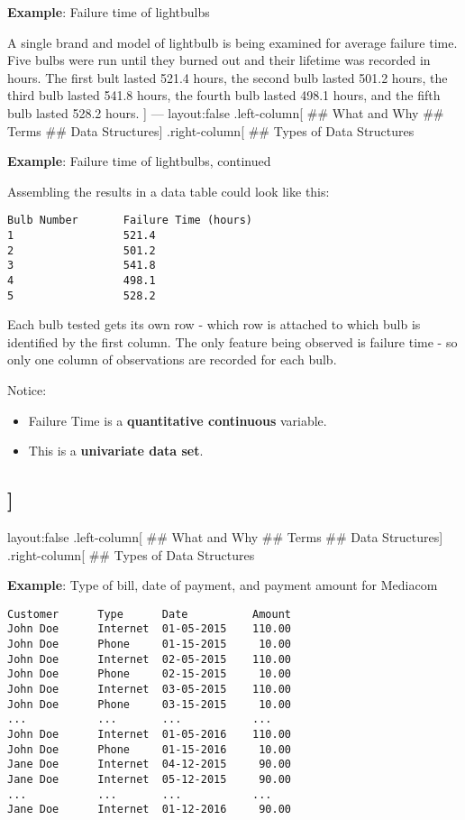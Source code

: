 \documentclass[]{article}
\providecommand{\tightlist}{%
  \setlength{\itemsep}{0pt}\setlength{\parskip}{0pt}}
\begin{document}
\textbf{Example}: Failure time of lightbulbs

A single brand and model of lightbulb is being examined for average
failure time. Five bulbs were run until they burned out and their
lifetime was recorded in hours. The first bult lasted 521.4 hours, the
second bulb lasted 501.2 hours, the third bulb lasted 541.8 hours, the
fourth bulb lasted 498.1 hours, and the fifth bulb lasted 528.2 hours.
{]} --- layout:false .left-column{[} \#\# What and Why \#\# Terms \#\#
Data Structures{]} .right-column{[} \#\# Types of Data Structures

\textbf{Example}: Failure time of lightbulbs, continued

Assembling the results in a data table could look like this:

\begin{verbatim}
Bulb Number       Failure Time (hours)
1                 521.4
2                 501.2
3                 541.8
4                 498.1
5                 528.2
\end{verbatim}

Each bulb tested gets its own row - which row is attached to which bulb
is identified by the first column. The only feature being observed is
failure time - so only one column of observations are recorded for each
bulb.

Notice:

\begin{itemize}
\tightlist
\item
  Failure Time is a \textbf{quantitative continuous} variable.
\item
  This is a \textbf{univariate data set}.
\end{itemize}

\subsection{{]}}\label{section}

layout:false .left-column{[} \#\# What and Why \#\# Terms \#\# Data
Structures{]} .right-column{[} \#\# Types of Data Structures

\textbf{Example}: Type of bill, date of payment, and payment amount for
Mediacom

\begin{verbatim}
Customer      Type      Date          Amount
John Doe      Internet  01-05-2015    110.00
John Doe      Phone     01-15-2015     10.00
John Doe      Internet  02-05-2015    110.00
John Doe      Phone     02-15-2015     10.00
John Doe      Internet  03-05-2015    110.00
John Doe      Phone     03-15-2015     10.00
...           ...       ...           ...
John Doe      Internet  01-05-2016    110.00
John Doe      Phone     01-15-2016     10.00
Jane Doe      Internet  04-12-2015     90.00
Jane Doe      Internet  05-12-2015     90.00
...           ...       ...           ...
Jane Doe      Internet  01-12-2016     90.00
\end{verbatim}
\end{document}
